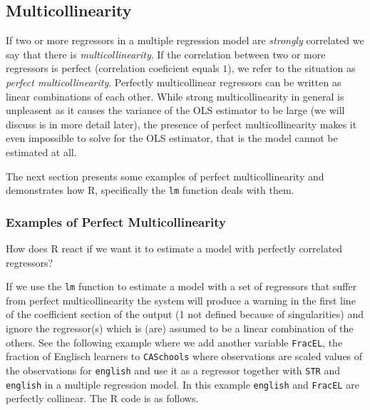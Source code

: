 \documentclass[]{book}
\theoremstyle{definition}
\theoremstyle{definition}
\theoremstyle{definition}
\theoremstyle{remark}
\begin{document}
\subsection*{Multicollinearity}\label{multicollinearity}

If two or more regressors in a multiple regression model are
\emph{strongly} correlated we say that there is
\emph{multicollinearity}. If the correlation between two or more
regressors is perfect (correlation coeficient equals \(1\)), we refer to
the situation as \emph{perfect multicollinearity}. Perfectly
multicollinear regressors can be written as linear combinations of each
other. While strong multicollinearity in general is unpleasent as it
causes the variance of the OLS estimator to be large (we will discuss is
in more detail later), the presence of perfect multicollinearity makes
it even impossible to solve for the OLS estimator, that is the model
cannot be estimated at all.

The next section presents some examples of perfect multicollinearity and
demonstrates how R, specifically the \texttt{lm} function deals with
them.

\subsubsection*{Examples of Perfect
Multicollinearity}\label{examples-of-perfect-multicollinearity}

How does R react if we want it to estimate a model with perfectly
correlated regressors?

If we use the \texttt{lm} function to estimate a model with a set of
regressors that suffer from perfect multicollinearity the system will
produce a warning in the first line of the coefficient section of the
output (1 not defined because of singularities) and ignore the
regressor(s) which is (are) assumed to be a linear combination of the
others. See the following example where we add another variable
\texttt{FracEL}, the fraction of Englisch learners to \texttt{CASchools}
where observations are scaled values of the observations for
\texttt{english} and use it as a regressor together with \texttt{STR}
and \texttt{english} in a multiple regression model. In this example
\texttt{english} and \texttt{FracEL} are perfectly collinear. The R code
is as follows.
\end{document}
